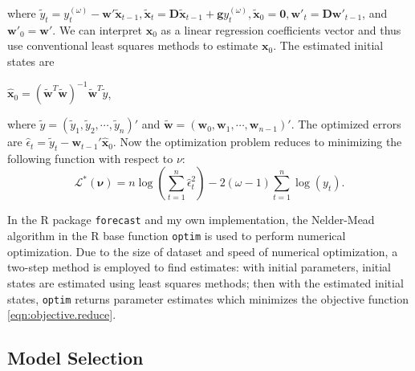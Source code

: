 \documentclass{uwstat572}
\begin{document}
where $ \tilde{y}_t=y_t^{(\omega)}- \textbf{w}' \tilde{\textbf{x}}_{t-1}, \tilde{\textbf{x}}_t=\textbf{D}\tilde{\textbf{x}}_{t-1}+\textbf{g}y_t^{(\omega)}, \tilde{\textbf{x}}_0=\textbf{0}, \textbf{w}'_{t}=\textbf{D}\textbf{w}'_{t-1}$, and $\textbf{w}'_{0}=\textbf{w}'$. We can interpret $\textbf{x}_0$ as a linear regression coefficients vector and thus use conventional least squares methods to estimate $\textbf{x}_0$. The estimated initial states are 
\begin{center}
$\displaystyle \hat{\textbf{x}}_0 = (\tilde{\textbf{w}}^T \tilde{\textbf{w}})^{-1}\tilde{\textbf{w}}^T \tilde{y}$,
\end{center}
where $\tilde{y}=(\tilde{y}_1 ,\tilde{y}_2  , \cdots , \tilde{y}_n )' $ and $\tilde{\textbf{w}}=(\textbf{w}_0 ,\textbf{w}_1  ,\cdots , \textbf{w}_{n-1})'$. The optimized errors are $\hat{\epsilon}_t=\tilde{y}_t-\textbf{w}_{t-1}' \hat{\textbf{x}}_0$. Now the optimization problem reduces to minimizing the following function with respect to $\nu$:
\begin{equation}
\mathcal{L}^{*}(\bm{\nu})=n \log (\sum\limits_{t=1}^n \hat{\epsilon}_t^2)-2(\omega-1) \sum\limits_{t=1}^n \log(y_t).
\label{eqn:objective.reduce}
\end{equation}

In the R package \texttt{forecast} and my own implementation, the Nelder-Mead algorithm in the R base function \texttt{optim} is used to perform numerical optimization. Due to the size of dataset and speed of numerical optimization, a two-step method is employed to find estimates: with initial parameters, initial states are estimated using least squares methods; then with the estimated initial states, \texttt{optim} returns parameter estimates which minimizes the objective function \ref{eqn:objective.reduce}.  

\subsection{Model Selection}
\label{sec:selection}
\end{document}
